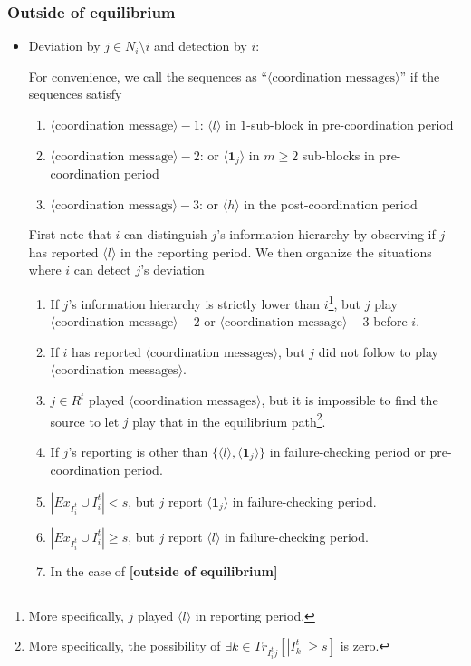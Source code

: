 \documentclass[12pt]{article}
\theoremstyle{remark}
\theoremstyle{remark}
\begin{document}
\subsubsection{Outside of equilibrium}
\begin{itemize}

\item Deviation by $j\in N_i\setminus i$ and detection by $i$:

For convenience, we call the sequences as ``$\langle \text{coordination messages} \rangle$'' if the sequences satisfy
\begin{enumerate}
\item $\langle \text{coordination message} \rangle-1$: $\langle l \rangle$ in $1$-sub-block in pre-coordination period
\item $\langle \text{coordination message} \rangle-2$: or $\langle \mathbf{1}_j \rangle$ in $m\geq 2$ sub-blocks in pre-coordination period
\item $\langle \text{coordination messags} \rangle-3$: or $\langle h \rangle$ in the post-coordination period
\end{enumerate}

First note that $i$ can distinguish $j$'s information hierarchy by observing if $j$ has reported $\langle l \rangle$ in the reporting period. We then organize the situations where $i$ can detect $j$'s deviation
\begin{enumerate}
\item If $j$'s information hierarchy is strictly lower than $i$\footnote{ More specifically, $j$ played $\langle l \rangle$ in reporting period.}, but $j$ play $\langle \text{coordination message} \rangle-2$ or  $\langle \text{coordination message} \rangle-3$ before $i$.
\item If $i$ has reported $\langle \text{coordination messages} \rangle$, but $j$ did not follow to play $\langle \text{coordination messages} \rangle$.
\item $j\in R^t$ played $\langle \text{coordination messages} \rangle$, but it is impossible to find the source to let $j$ play that in the equilibrium path\footnote{More specifically, the possibility of $\exists k\in Tr_{I^t_ij}[|I^t_k|\geq s]$ is zero.}.
\item If $j$'s reporting is other than $\{\langle l \rangle, \langle \mathbf{1}_j \rangle\}$ in failure-checking period or pre-coordination period.
\item $|Ex_{I^{t}_i}\cup I^{t}_i|<s$, but $j$ report $\langle \mathbf{1}_j \rangle$ in failure-checking period.
\item $|Ex_{I^{t}_i}\cup I^{t}_i|\geq s$, but $j$ report $\langle l \rangle$ in failure-checking period.
\item In the case of \textbf{[outside of equilibrium]}
\end{enumerate}


\end{itemize}
\end{document}
